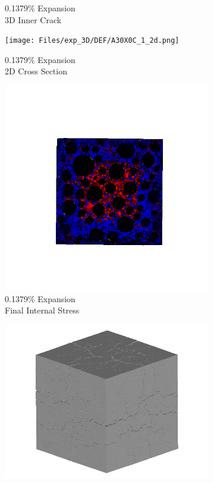 \begin{figure}[ht!]
\begin{subfigure}{.25\textwidth}
      \caption{0.1379\% Expansion\\3D Inner Crack}
    \end{subfigure}%
    \begin{subfigure}{.25\textwidth}
      \centering
      \texttt{[image: Files/exp\_3D/DEF/A30X0C\_1\_2d.png]}
      \caption{0.1379\% Expansion\\2D Cross Section}
    \end{subfigure}%
    \begin{subfigure}{.25\textwidth}
      \centering
      \includegraphics[width=.8\linewidth]{Files/exp_3D/DEF/A30X0C_1_stress.png}
      \caption{0.1379\% Expansion\\Final Internal Stress}
    \end{subfigure}
    \begin{subfigure}{.25\textwidth}
      \centering
      \includegraphics[width=.8\linewidth]{Files/exp_3D/DEF/A30X0C_2_3d.png}

\end{subfigure}
\end{figure}
